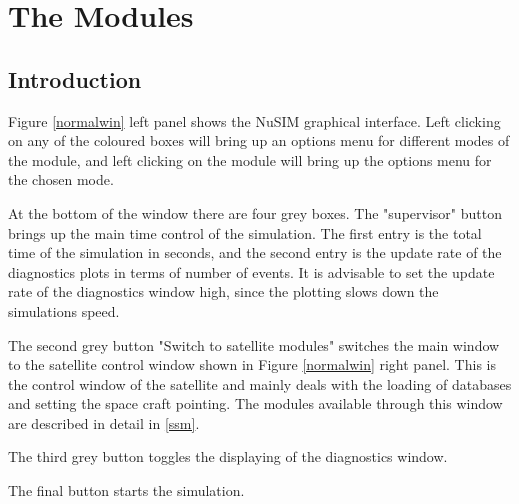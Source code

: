 \chapter{The Modules}

\section{Introduction}
Figure \ref{normalwin} left panel shows the NuSIM graphical interface. Left clicking on any of the coloured boxes will bring up an options menu for different modes of the module, and left clicking on the module will bring up the options menu for the chosen mode. 

At the bottom of the window there are four grey boxes. The "supervisor" button brings up the main time control of the simulation. The first entry is the total time of the simulation in seconds, and the second entry is the update rate of the diagnostics plots in terms of number of events. It is advisable to set the update rate of the diagnostics window high, since the plotting slows down the simulations speed.

The second grey button "Switch to satellite modules" switches the main window to the satellite control window shown in Figure \ref{normalwin} right panel. This is the control window of the satellite and mainly deals with the loading of databases and setting the space craft pointing. The modules available through this window are described in detail in \ref{ssm}.

The third grey button toggles the displaying of the diagnostics window.

The final button starts the simulation.


